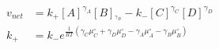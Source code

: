 \begin{eqnarray}
v_{net} & = k_+[A]^{\gamma_A}[B]_^{\gamma_B} - k_-[C]^{\gamma_C}[D]^{\gamma_D} \\
k_+ &=  k_-e^{\frac{1}{RT}\left(\gamma_C\mu_C^\circ+ \gamma_D\mu_D^\circ -\gamma_A\mu_A^\circ-\gamma_B\mu_B^\circ\right)} \\
\end{eqnarray}